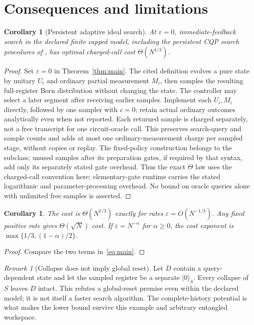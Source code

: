 \documentclass[11pt]{article}
\newtheorem{corollary}[theorem]{Corollary}
\theoremstyle{remark}
\newtheorem{remark}[theorem]{Remark}
\newcommand{\eps}{\varepsilon}
\newcommand{\ket}[1]{\lvert #1\rangle}
\begin{document}
\section{Consequences and limitations}
\begin{corollary}[Persistent adaptive ideal search]
At $\eps=0$, immediate-feedback search in the declared finite capped model,
including the persistent CQP search procedures of \cite{abflcqp}, has
optimal charged-call cost $\Theta(N^{1/3})$.
\end{corollary}
\begin{proof}
Set $\eps=0$ in Theorem~\ref{thm:main}. The cited definition evolves a pure
state by unitary $U_i$ and ordinary partial measurement $M_i$, then samples
the resulting full-register Born distribution without changing the state.
The controller may select a later segment after receiving earlier samples.
Implement each $U_i,M_i$ directly, followed by one sampler with $c=0$;
retain actual ordinary outcomes analytically even when not reported.
Each returned sample is charged separately, not a free transcript for one
circuit-oracle call. This preserves search-query and sample counts and
adds at most one ordinary-measurement charge per sampled stage, without
copies or replay. The fixed-policy construction belongs to the subclass;
unused samples after its preparation gates, if required by that syntax,
add only its separately stated gate overhead. Thus the exact $\Theta$ law
uses the charged-call convention here; elementary-gate runtime carries the
stated logarithmic and parameter-processing overhead. No bound on oracle
queries alone with unlimited free samples is asserted.
\end{proof}

\begin{corollary}
The cost is $\Theta(N^{1/3})$ exactly for rates
$\eps=O(N^{-1/3})$. Any fixed positive rate gives $\Theta(\sqrt N)$ cost.
If $\eps=N^{-\alpha}$ for $\alpha\ge0$, the cost exponent is
$\max\{1/3,(1-\alpha)/2\}$.
\end{corollary}
\begin{proof}
Compare the two terms in~\eqref{eq:main}.
\end{proof}

\begin{remark}[Collapse does not imply global reset]
Let $D$ contain a query-dependent state and let the sampled register be a
separate $\ket0_S$. Every collapse of $S$ leaves $D$ intact. This refutes
a global-reset premise even within the declared model; it is not itself a
faster search algorithm. The complete-history potential is what makes the
lower bound survive this example and arbitrary entangled workspace.
\end{remark}
\end{document}
